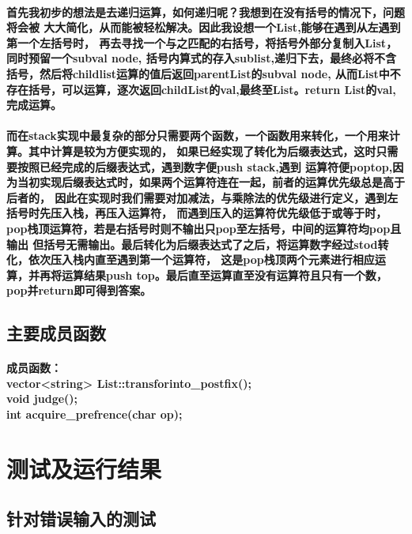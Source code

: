 \documentclass[UTF8]{ctexart}
\begin{document}
\paragraph{\hspace{2em}
首先我初步的想法是去递归运算，如何递归呢？我想到在没有括号的情况下，问题将会被
大大简化，从而能被轻松解决。因此我设想一个List,能够在遇到从左遇到第一个左括号时，
再去寻找一个与之匹配的右括号，将括号外部分复制入List，同时预留一个subval node,
括号内算式的存入sublist,递归下去，最终必将不含括号，然后将childlist运算的值后返回parentList的subval node,
从而List中不存在括号，可以运算，逐次返回childList的val,最终至List。return List的val,完成运算。}
\paragraph{
\hspace{2em}而在stack实现中最复杂的部分只需要两个函数，一个函数用来转化，一个用来计算。其中计算是较为方便实现的，
如果已经实现了转化为后缀表达式，这时只需要按照已经完成的后缀表达式，遇到数字便push stack,遇到
运算符便poptop,因为当初实现后缀表达式时，如果两个运算符连在一起，前者的运算优先级总是高于后者的，
因此在实现时我们需要对加减法，与乘除法的优先级进行定义，遇到左括号时先压入栈，再压入运算符，
而遇到压入的运算符优先级低于或等于时，pop栈顶运算符，若是右括号时则不输出只pop至左括号，中间的运算符均pop且输出
但括号无需输出。最后转化为后缀表达式了之后，将运算数字经过stod转化，依次压入栈内直至遇到第一个运算符，
这是pop栈顶两个元素进行相应运算，并再将运算结果push top。最后直至运算直至没有运算符且只有一个数，
pop并return即可得到答案。
}
\subsection{主要成员函数}
\paragraph{
    \hspace{2em}成员函数：\\
    vector<string> List::transforinto\_postfix();\\
    void judge();\\
    int acquire\_prefrence(char op);
}
\section{测试及运行结果}
\subsection{针对错误输入的测试}
\end{document}
